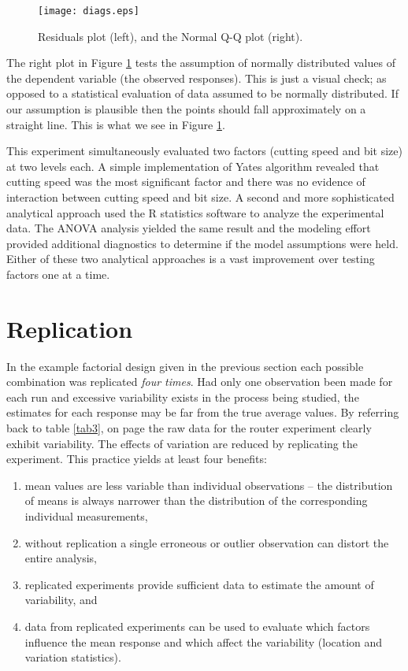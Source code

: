 \begin{figure}
	\begin{center}
		\texttt{[image: diags.eps]}
	\end{center}
	\caption{Residuals plot (left), and the Normal Q-Q plot (right).}\label{diagplot}
\end{figure}

The right plot in Figure \ref{diagplot} tests the assumption of normally distributed values of the dependent variable (the observed responses). This is just a visual check; as opposed to a statistical evaluation of data assumed to be normally distributed. If our assumption is plausible then the points should fall approximately on a straight line. This is what we see in Figure \ref{diagplot}.

This experiment simultaneously evaluated two factors (cutting speed and bit size) at two levels each. A simple implementation of Yates algorithm revealed that cutting speed was the most significant factor and there was no evidence of interaction between cutting speed and bit size. A second and more sophisticated analytical approach used the R statistics software to analyze the experimental data. The ANOVA analysis yielded the same result and the modeling effort provided additional diagnostics to determine if the model assumptions were held. Either of these two analytical approaches is a vast improvement over testing factors one at a time.


\section{Replication}
In the example factorial design given in the previous section each possible combination was replicated \textit{four times}. Had only one observation been made for each run and excessive variability exists in the process being studied, the estimates for each response may be far from the true average values. By referring back to table \ref{tab3}, on page \pageref{tab3} the raw data for the router experiment clearly exhibit variability. The effects of variation are reduced by replicating the experiment.  This practice yields at least four benefits:

\begin{enumerate}
\item mean values are less variable than individual observations -- the distribution of means is always narrower than the distribution of the corresponding individual measurements,
\item without replication a single erroneous or outlier observation can distort the entire analysis,
\item replicated experiments provide sufficient data to estimate the amount of variability, and
\item data from replicated experiments can be used to evaluate which factors influence the mean response and which affect the variability (location and variation statistics).
\end{enumerate}


